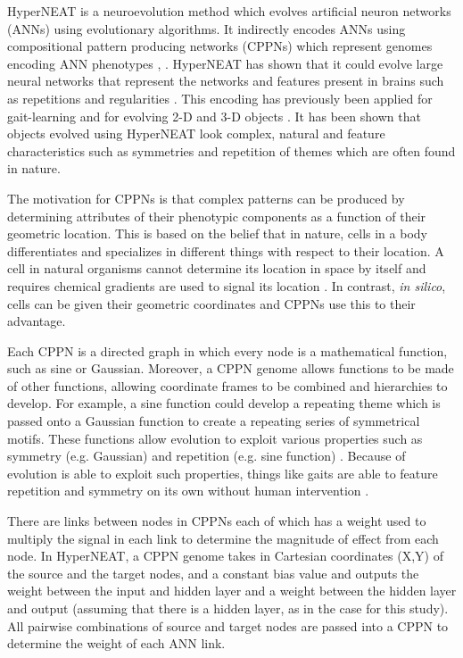 HyperNEAT is a neuroevolution method which evolves artificial neuron networks (ANNs) using evolutionary algorithms.
It indirectly encodes ANNs using compositional pattern producing networks (CPPNs) which represent genomes encoding ANN phenotypes \cite{stanley1}, \cite{stanley2}. 
HyperNEAT has shown that it could evolve large neural networks that represent the networks and features present in brains such as repetitions and regularities \cite{stanley3}. 
This encoding has previously been applied for gait-learning \cite{yos:clune} and for evolving 2-D and 3-D objects \cite{clune:lipson}. 
It has been shown that objects evolved using HyperNEAT look complex, natural and feature characteristics such as symmetries and repetition of themes which are often found in nature. %


The motivation for CPPNs is that complex patterns can be produced by determining attributes of their phenotypic components as a function of their geometric location. 
This is based on the belief that in nature, cells in a body differentiates and specializes in different things with respect to their location. 
A cell in natural organisms cannot determine its location in space by itself and requires chemical gradients are used to signal its location \cite{carroll}. 
In contrast, \emph{in silico}, cells can be given their geometric coordinates and CPPNs use this to their advantage. 


Each CPPN is a directed graph in which every node is a mathematical function, such as sine or Gaussian. %
Moreover, a CPPN genome allows functions to be made of other functions, allowing coordinate frames to be combined and hierarchies to develop.
For example, a sine function could develop a repeating theme which is passed onto a Gaussian function to create a repeating series of symmetrical motifs. 
These functions allow evolution to exploit various properties such as symmetry (e.g. Gaussian) and repetition (e.g. sine function) \cite{stanley1}. 
Because of evolution is able to exploit such properties, things like gaits are able to feature repetition and symmetry on its own without human intervention \cite{clune1}. 


There are links between nodes in CPPNs each of which has a weight used to multiply the signal in each link to determine the magnitude of effect from each node. 
In HyperNEAT, a CPPN genome takes in Cartesian coordinates (X,Y) of the source and the target nodes, and a constant bias value and outputs the weight between the input and hidden layer and a weight between the hidden layer and output (assuming that there is a hidden layer, as in the case for this study). 
All pairwise combinations of source and target nodes are passed into a CPPN to determine the weight of each ANN link. 


